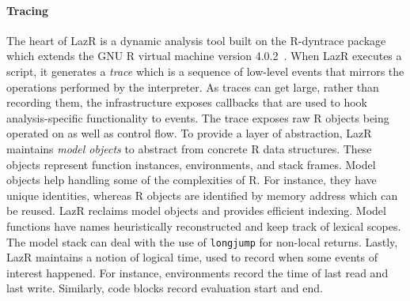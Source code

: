 \documentclass[review,creen,acmsmall]{acmart}
\newcommand{\rdyn}{{\sf R-dyntrace}\xspace}
\renewcommand{\c}[1]{\lstinline |#1|\xspace}
\newcommand{\lazr}{{\sf LazR}\xspace}
\begin{document}
\paragraph{Tracing}
The heart of \lazr is a dynamic analysis tool built on the \rdyn package which
extends the GNU R virtual machine version 4.0.2~\cite{oopsla19b}. When \lazr
executes a script, it generates a \emph{trace} which is a sequence of low-level
events that mirrors the operations performed by the interpreter. As traces can
get large, rather than recording them, the infrastructure exposes callbacks that
are used to hook analysis-specific functionality to events. The trace exposes
raw R objects being operated on as well as control flow. To provide a layer of
abstraction, \lazr maintains \emph{model objects} to abstract from concrete R
data structures. These objects represent function instances, environments, and
stack frames. Model objects help handling some of the complexities of R. For
instance, they have unique identities, whereas R objects are identified by
memory address which can be reused. \lazr reclaims model objects and provides
efficient indexing. Model functions have names heuristically reconstructed and
keep track of lexical scopes. The model stack can deal with the use of
\c{longjump} for non-local returns. Lastly, \lazr maintains a notion of logical
time, used to record when some events of interest happened. For instance,
environments record the time of last read and last write. Similarly, code blocks
record evaluation start and end.
\end{document}
